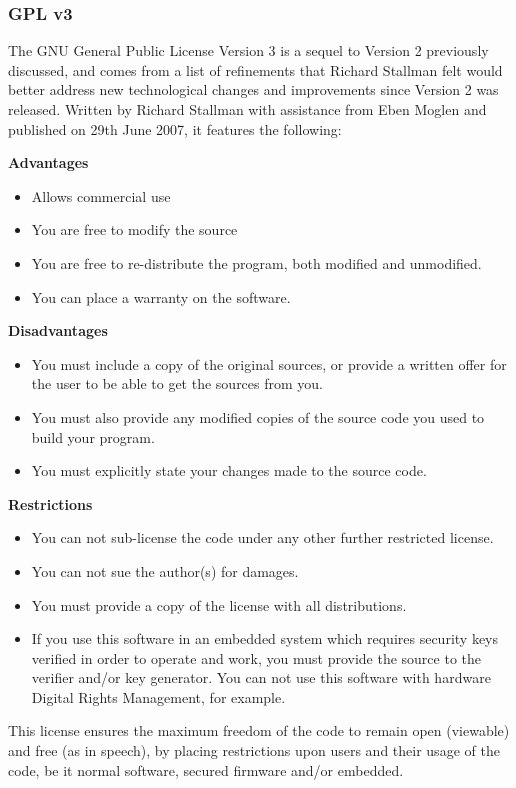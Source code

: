 \subsubsection{GPL v3}
The GNU General Public License Version 3 is a sequel to Version 2 previously discussed, and comes from a list of refinements that Richard Stallman felt would better address new technological changes and improvements since Version 2 was released. Written by Richard Stallman with assistance from Eben Moglen\cite{gpl3} and published on 29th June 2007\cite{gpl3published}, it features the following:

\textbf{Advantages}
\begin{itemize}
\item Allows commercial use
\item You are free to modify the source
\item You are free to re-distribute the program, both modified and unmodified.
\item You can place a warranty on the software.
\end{itemize}
\textbf{Disadvantages}
\begin{itemize}
\item You must include a copy of the original sources, or provide a written offer for the user to be able to get the sources from you.
\item You must also provide any modified copies of the source code you used to build your program.
\item You must explicitly state your changes made to the source code.
\end{itemize}
\textbf{Restrictions}
\begin{itemize}
\item You can not sub-license the code under any other further restricted license.
\item You can not sue the author(s) for damages.
\item You must provide a copy of the license with all distributions.
\item If you use this software in an embedded system which requires security keys verified in order to operate and work, you must provide the source to the verifier and/or key generator. You can not use this software with hardware Digital Rights Management, for example.
\end{itemize}
This license ensures the maximum freedom of the code to remain open (viewable) and free (as in speech), by placing restrictions upon users and their usage of the code, be it normal software, secured firmware and/or embedded.

